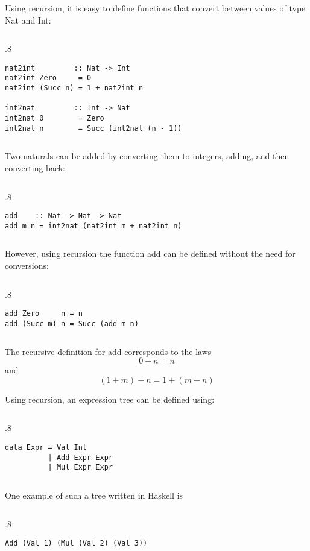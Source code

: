 \documentclass{beamer}
\newenvironment{codeblock}[1][.8]{%
\begin{columns}
\begin{column}{#1\linewidth}
\begin{exampleblock}{}}{%
\end{exampleblock}
\end{column}
\end{columns}}
\newenvironment{execblock}[1][.8]{%
\begin{columns}
\begin{column}{#1\linewidth}
\begin{block}{}}{%
\end{block}
\end{column}
\end{columns}}
\def\frameskip{\vskip 0.1in}
\begin{document}
\begin{frame}[fragile]

\large
Using recursion, it is easy to define functions that 
convert between values of type Nat and Int: 

\frameskip

\begin{codeblock}
\begin{verbatim}
nat2int         :: Nat -> Int 
nat2int Zero     = 0 
nat2int (Succ n) = 1 + nat2int n 

int2nat         :: Int -> Nat 
int2nat 0        = Zero 
int2nat n        = Succ (int2nat (n - 1))
\end{verbatim}
\end{codeblock}

\end{frame}

\begin{frame}[fragile]

\large
Two naturals can be added by converting them to 
integers, adding, and then converting back: 

\frameskip

\begin{codeblock}
\begin{verbatim}
add    :: Nat -> Nat -> Nat 
add m n = int2nat (nat2int m + nat2int n) 
\end{verbatim}
\end{codeblock}
\frameskip
However, using recursion the function add can be 
defined without the need for conversions: 
\frameskip
\begin{codeblock}
\begin{verbatim}
add Zero     n = n 
add (Succ m) n = Succ (add m n) 
\end{verbatim}
\end{codeblock}
\frameskip
The recursive definition for add corresponds to 
the laws 
$$0+n = n$$ and $$(1+m)+n = 1+(m+n)$$
\end{frame}

\begin{frame}[fragile]

\Large
Using recursion, an expression tree can be defined using:

\frameskip

\begin{codeblock}
\begin{verbatim}
data Expr = Val Int 
          | Add Expr Expr 
          | Mul Expr Expr 
\end{verbatim}
\end{codeblock}
\frameskip

One example of such a tree written in Haskell is
\frameskip
\begin{execblock}
\begin{verbatim}
Add (Val 1) (Mul (Val 2) (Val 3))
\end{verbatim}
\end{execblock}
\frameskip


\end{frame}
\end{document}
